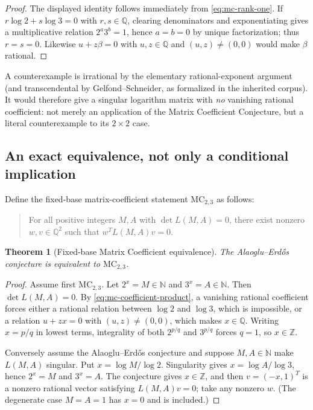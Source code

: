\documentclass[11pt,oneside]{article}
\newtheorem{theorem}{Theorem}[section]
\theoremstyle{definition}
\theoremstyle{remark}
\newcommand{\N}{\mathbb N}
\newcommand{\Z}{\mathbb Z}
\newcommand{\Q}{\mathbb Q}
\begin{document}
\begin{proof}
The displayed identity follows immediately from \eqref{eq:mc-rank-one}.  If
$r\log2+s\log3=0$ with $r,s\in\Q$, clearing denominators and exponentiating gives a
multiplicative relation $2^a3^b=1$, hence $a=b=0$ by unique factorization; thus $r=s=0$.
Likewise $u+z\beta=0$ with $u,z\in\Q$ and $(u,z)\ne(0,0)$ would make $\beta$ rational.
\end{proof}

A counterexample is irrational by the elementary rational-exponent argument (and
transcendental by Gelfond--Schneider, as formalized in the inherited corpus).  It would
therefore give a singular logarithm matrix with \emph{no} vanishing rational coefficient: not
merely an application of the Matrix Coefficient Conjecture, but a literal counterexample to its
$2\times2$ case.

\subsection{An exact equivalence, not only a conditional implication}

Define the fixed-base matrix-coefficient statement $\mathrm{MC}_{2,3}$ as follows:

\begin{quote}
For all positive integers $M,A$ with $\det L(M,A)=0$, there exist nonzero
$w,v\in\Q^2$ such that $w^TL(M,A)v=0$.
\end{quote}

\begin{theorem}[Fixed-base Matrix Coefficient equivalence]
\label{thm:mc-equivalence}
The Alaoglu--Erd\H{o}s conjecture is equivalent to $\mathrm{MC}_{2,3}$.
\end{theorem}

\begin{proof}
Assume first $\mathrm{MC}_{2,3}$.  Let $2^x=M\in\N$ and $3^x=A\in\N$.  Then
$\det L(M,A)=0$.  By \eqref{eq:mc-coefficient-product}, a vanishing rational coefficient
forces either a rational relation between $\log2$ and $\log3$, which is impossible, or a
relation $u+zx=0$ with $(u,z)\ne(0,0)$, which makes $x\in\Q$.  Writing $x=p/q$ in lowest
terms, integrality of both $2^{p/q}$ and $3^{p/q}$ forces $q=1$, so $x\in\Z$.

Conversely assume the Alaoglu--Erd\H{o}s conjecture and suppose $M,A\in\N$ make
$L(M,A)$ singular.  Put $x=\log M/\log2$.  Singularity gives
$x=\log A/\log3$, hence $2^x=M$ and $3^x=A$.  The conjecture gives $x\in\Z$, and then
$v=(-x,1)^T$ is a nonzero rational vector satisfying $L(M,A)v=0$; take any nonzero $w$.
(The degenerate case $M=A=1$ has $x=0$ and is included.)
\end{proof}
\end{document}
